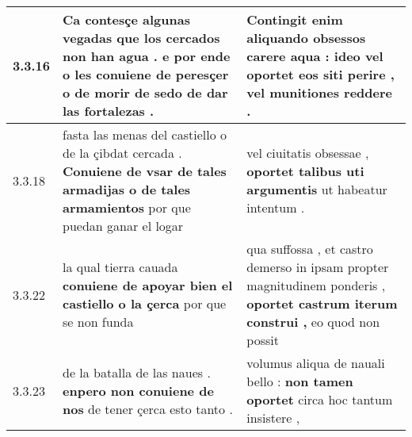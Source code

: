 \begin{tabular}{|p{1cm}|p{6.5cm}|p{6.5cm}|}
3.3.16 & Ca contesçe algunas vegadas que los cercados non han agua . \textbf{ e por ende o les conuiene de peresçer o de morir } de sedo de dar las fortalezas . & Contingit enim aliquando obsessos carere aqua : \textbf{ ideo vel oportet eos siti perire , } vel munitiones reddere . \\\hline
3.3.18 & fasta las menas del castiello o de la çibdat cercada . \textbf{ Conuiene de vsar de tales armadijas o de tales armamientos } por que puedan ganar el logar & vel ciuitatis obsessae , \textbf{ oportet talibus uti argumentis } ut habeatur intentum . \\\hline
3.3.22 & la qual tierra cauada \textbf{ conuiene de apoyar bien el castiello o la çerca } por que se non funda & qua suffossa , et castro demerso in ipsam propter magnitudinem ponderis , \textbf{ oportet castrum iterum construi , } eo quod non possit \\\hline
3.3.23 & de la batalla de las naues . \textbf{ enpero non conuiene de nos } de tener çerca esto tanto . & volumus aliqua de nauali bello : \textbf{ non tamen oportet } circa hoc tantum insistere , \\\hline

\end{tabular}
